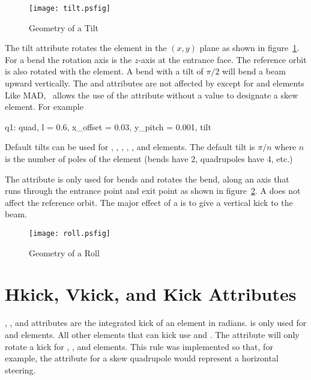 \begin{figure}
  \centering
  \texttt{[image: tilt.psfig]}
  \caption{Geometry of a Tilt}
  \label{f:tilt}
\end{figure}

The tilt attribute rotates the element in the $(x, y)$ plane as
shown in figure~\ref{f:tilt}. For a bend the rotation axis is the
$z$-axis at the entrance face. The reference orbit is also rotated
with the element. A bend with a tilt of $\pi/2$ will bend a beam
upward vertically. The  and  attributes are
not affected by  except for  and 
elements
Like MAD, \bmad\ allows the use of the  attribute without
a value to designate a skew element. For example
\begin{example}
  q1: quad, l = 0.6, x_offset = 0.03, y_pitch = 0.001, tilt
\end{example}
Default tilts can be used for , , ,
, , and  elements.
The default tilt is $\pi/n$ where $n$ is the number of poles of the
element (bends have 2, quadrupoles have 4, etc.) 


The  attribute is only used for bends
and rotates the bend, along an axis that runs through the entrance
point and exit point as shown in figure~\ref{f:roll}. A  
does not affect the reference orbit. The major effect of a 
is to give a vertical kick to the beam.
\begin{figure}
  \centering
  \texttt{[image: roll.psfig]}
  \caption{Geometry of a Roll}
  \label{f:roll}
\end{figure}


\section{Hkick, Vkick, and Kick Attributes}
\label{s:kick}

, , and  attributes are the integrated
kick of an element in radians.  is only used for 
and  elements. All other elements that can kick use 
 and . The  attribute will only rotate
a kick for , ,  and 
elements. This rule was implemented so that, for example, the 
 attribute for a skew quadrupole
would represent a horizontal steering.

